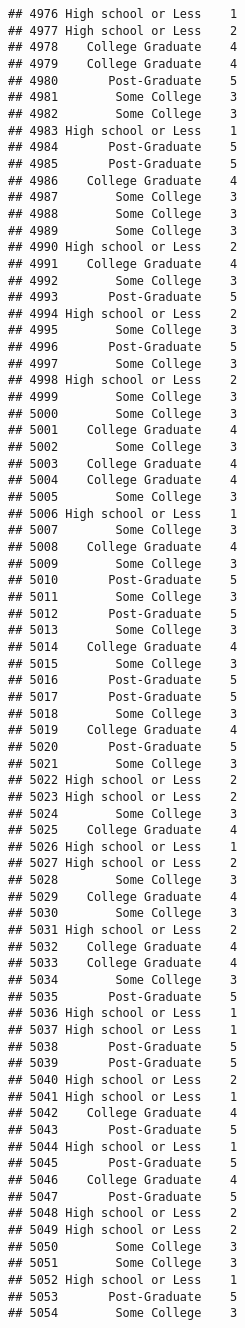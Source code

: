 \documentclass[
]{article}
\begin{document}
\begin{verbatim}
## 4976 High school or Less    1
## 4977 High school or Less    2
## 4978    College Graduate    4
## 4979    College Graduate    4
## 4980       Post-Graduate    5
## 4981        Some College    3
## 4982        Some College    3
## 4983 High school or Less    1
## 4984       Post-Graduate    5
## 4985       Post-Graduate    5
## 4986    College Graduate    4
## 4987        Some College    3
## 4988        Some College    3
## 4989        Some College    3
## 4990 High school or Less    2
## 4991    College Graduate    4
## 4992        Some College    3
## 4993       Post-Graduate    5
## 4994 High school or Less    2
## 4995        Some College    3
## 4996       Post-Graduate    5
## 4997        Some College    3
## 4998 High school or Less    2
## 4999        Some College    3
## 5000        Some College    3
## 5001    College Graduate    4
## 5002        Some College    3
## 5003    College Graduate    4
## 5004    College Graduate    4
## 5005        Some College    3
## 5006 High school or Less    1
## 5007        Some College    3
## 5008    College Graduate    4
## 5009        Some College    3
## 5010       Post-Graduate    5
## 5011        Some College    3
## 5012       Post-Graduate    5
## 5013        Some College    3
## 5014    College Graduate    4
## 5015        Some College    3
## 5016       Post-Graduate    5
## 5017       Post-Graduate    5
## 5018        Some College    3
## 5019    College Graduate    4
## 5020       Post-Graduate    5
## 5021        Some College    3
## 5022 High school or Less    2
## 5023 High school or Less    2
## 5024        Some College    3
## 5025    College Graduate    4
## 5026 High school or Less    1
## 5027 High school or Less    2
## 5028        Some College    3
## 5029    College Graduate    4
## 5030        Some College    3
## 5031 High school or Less    2
## 5032    College Graduate    4
## 5033    College Graduate    4
## 5034        Some College    3
## 5035       Post-Graduate    5
## 5036 High school or Less    1
## 5037 High school or Less    1
## 5038       Post-Graduate    5
## 5039       Post-Graduate    5
## 5040 High school or Less    2
## 5041 High school or Less    1
## 5042    College Graduate    4
## 5043       Post-Graduate    5
## 5044 High school or Less    1
## 5045       Post-Graduate    5
## 5046    College Graduate    4
## 5047       Post-Graduate    5
## 5048 High school or Less    2
## 5049 High school or Less    2
## 5050        Some College    3
## 5051        Some College    3
## 5052 High school or Less    1
## 5053       Post-Graduate    5
## 5054        Some College    3

\end{verbatim}
\end{document}
